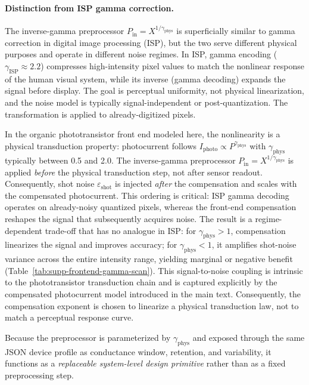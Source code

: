 \paragraph{Distinction from ISP gamma correction.}
The inverse-gamma preprocessor $P_{\text{in}} = X^{1/\gamma_{\text{phys}}}$ is superficially similar to gamma correction in digital image processing (ISP), but the two serve different physical purposes and operate in different noise regimes. In ISP, gamma encoding ($\gamma_{\text{ISP}} \approx 2.2$) compresses high-intensity pixel values to match the nonlinear response of the human visual system, while its inverse (gamma decoding) expands the signal before display. The goal is perceptual uniformity, not physical linearization, and the noise model is typically signal-independent or post-quantization. The transformation is applied to already-digitized pixels.

In the organic phototransistor front end modeled here, the nonlinearity is a physical transduction property: photocurrent follows $I_{\text{photo}} \propto P^{\gamma_{\text{phys}}}$ with $\gamma_{\text{phys}}$ typically between 0.5 and 2.0. The inverse-gamma preprocessor $P_{\text{in}} = X^{1/\gamma_{\text{phys}}}$ is applied \emph{before} the physical transduction step, not after sensor readout. Consequently, shot noise $\varepsilon_{\text{shot}}$ is injected \emph{after} the compensation and scales with the compensated photocurrent. This ordering is critical: ISP gamma decoding operates on already-noisy quantized pixels, whereas the front-end compensation reshapes the signal that subsequently acquires noise. The result is a regime-dependent trade-off that has no analogue in ISP: for $\gamma_{\text{phys}} > 1$, compensation linearizes the signal and improves accuracy; for $\gamma_{\text{phys}} < 1$, it amplifies shot-noise variance across the entire intensity range, yielding marginal or negative benefit (Table~\ref{tab:supp-frontend-gamma-scan}). This signal-to-noise coupling is intrinsic to the phototransistor transduction chain and is captured explicitly by the compensated photocurrent model introduced in the main text. Consequently, the compensation exponent is chosen to linearize a physical transduction law, not to match a perceptual response curve.

Because the preprocessor is parameterized by $\gamma_{\text{phys}}$ and exposed through the same JSON device profile as conductance window, retention, and variability, it functions as a \emph{replaceable system-level design primitive} rather than as a fixed preprocessing step.

